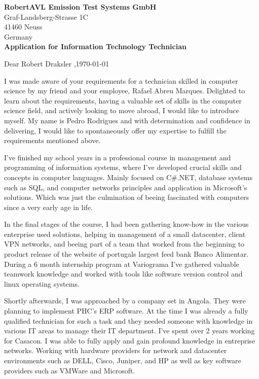\documentclass{letter}
\renewcommand*{\opening}[1]{\vspace{2\parskip}%
#1 \toname,\hfill\today\par\nobreak
}
\begin{document}
\begin{letter}{}

\textbf{RobertAVL Emission Test Systems GmbH}\\
Graf-Landsberg-Strasse 1C\\
41460 Neuss\\
Germany\\

\textbf{Application for Information Technology Technician}

\opening{Dear Robert Draksler}


I was made aware of your requirements for a technician skilled in computer science by my friend and
your employee, Rafael Abreu Marques. Delighted to learn about the requirements, having a valuable
set of skills in the computer science field, and actively looking to move abroad, I would like to
introduce myself. My name is Pedro Rodrigues and with determination and confidence in delivering, I
would like to spontaneously offer my expertise to fulfill the requirements mentioned above.

I've finished my school years in a professional course in management and programming of information
systems, where I've developed crucial skills and concepts in computer languages. Mainly focused on
C\#.NET, database systems such as SQL, and computer networks principles and application in
Microsoft's solutions. Which was just the culmination of beeing fascinated with computers since a
very early age in life.

In the final stages of the course, I had been gathering know-how in the various enterprise used
solutions, helping in management of a small datacenter, client VPN networks, and beeing part of a
team that worked from the beginning to product release of the website of portugals largest feed
bank Banco Alimentar. During a 6 month internship program at Variograma I've gathered valuable
teamwork knowledge and worked with tools like software version control and linux operating systems.

Shortly afterwards, I was approached by a company set in Angola. They were planning to implement
PHC's ERP software. At the time I was already a fully qualified technician for such a task and they
needed someone with knowledge in various IT areas to manage their IT department. I've spent over 2
years working for Casacon. I was able to fully apply and gain profound knowledge in entreprise
networks. Working with hardware providers for network and datacenter environments such as DELL,
Cisco, Juniper, and HP as well as key software providers such as VMWare and Microsoft.


\end{letter}
\end{document}
